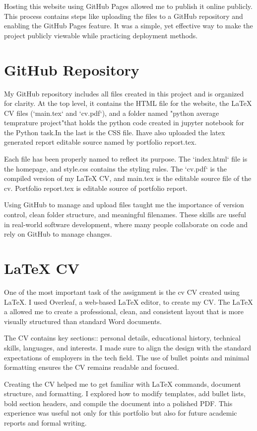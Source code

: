 \documentclass[14pt]{article}
\begin{document}
Hosting this website using GitHub Pages allowed me to publish it online publicly. This process contains steps like  uploading the files to a GitHub repository and enabling the GitHub Pages feature. It was a simple, yet effective way to make the project publicly viewable while practicing deployment methods.

\section*{GitHub Repository}
My GitHub repository includes all files created in this project and is organized for clarity. At the top level, it contains the HTML file for the website, the LaTeX CV files (`main.tex` and `cv.pdf`), and a folder named "python average temprature project"that holds the python code created in jupyter notebook for the Python task.In the last is the CSS file. Ihave also uploaded the latex generated report editable source named by portfolio report.tex.

Each file has been properly named to reflect its purpose. The `index.html` file is the homepage, and style.css contains the styling rules. The `cv.pdf` is the compiled version of my LaTeX CV, and main.tex is the editable source file of the cv. Portfolio report.tex is editable source of portfolio report.

Using GitHub to manage and upload files taught me the importance of version control, clean folder structure, and meaningful filenames. These skills are useful in real-world software development, where many people collaborate on code and rely on GitHub to manage changes.

\section*{LaTeX CV}
One of the most important task of the assignment is the cv CV created using LaTeX. I used Overleaf, a web-based LaTeX editor, to create my CV. The LaTeX a allowed me to create a professional, clean, and consistent layout that is more visually structured than standard Word documents.

The CV contains key sections:: personal details, educational history, technical skills, languages, and interests. I made sure to align the design with the standard expectations of employers in the tech field. The use of bullet points and minimal formatting ensures the CV remains readable and focused.

Creating the CV helped me to get familiar with LaTeX commands, document structure, and formatting. I explored how to modify templates, add bullet lists, bold section headers, and compile the document into a polished PDF. This experience was useful not only for this portfolio but also for future academic reports and formal writing.
\end{document}
